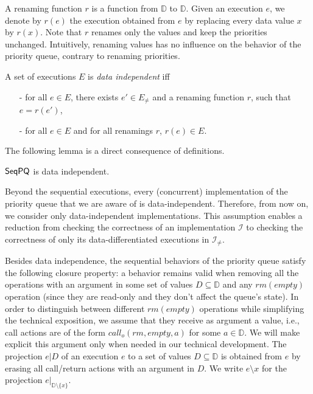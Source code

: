A renaming function $r$ is a function from $\mathbb{D}$ to $\mathbb{D}$. Given an execution $e$, we denote by $r(e)$ the execution obtained from $e$ by replacing every data value $x$ by $r(x)$. Note that $r$ renames only the values and keep the priorities unchanged. Intuitively, renaming values has no influence on the behavior of the priority queue, contrary to renaming priorities.

\begin{definition}\label{def:priority-value data-independence}
A set of executions $E$ is \emph{data independent} iff
\begin{itemize}
\setlength{\itemsep}{0.5pt}
\item[-] for all $e \in E$, there exists $e' \in E_{\neq}$ and a renaming function $r$, such that $e=r(e')$,

\item[-] for all $e \in E$ and for all renamings $r$, $r(e) \in E$.
\end{itemize}
\end{definition}

The following lemma is a direct consequence of definitions.

\begin{lemma}
$\mathsf{SeqPQ}$ is data independent.
\end{lemma}

Beyond the sequential executions, every (concurrent) implementation of the priority queue that we are aware of is data-independent. Therefore, from now on, we consider only data-independent implementations. This assumption enables a reduction from checking the correctness of an implementation $\mathcal{I}$ to checking the correctness of only its data-differentiated executions in $\mathcal{I}_{\neq}$.

Besides data independence, the sequential behaviors of the priority queue satisfy the following closure property: a behavior remains valid when removing all the operations with an argument in some set of values $D \subseteq \mathbb{D}$ and any $\textit{rm}(\textit{empty})$ operation (since they are read-only and they don't affect the queue's state).
In order to distinguish between different $\textit{rm}(\textit{empty})$ operations while simplifying the technical exposition, we assume that they receive as argument a value, i.e., call actions are of the form $\textit{call}_o(\textit{rm},\textit{empty},a)$ for some $a\in \mathbb{D}$. We will make explicit this argument only when needed in our technical development. The projection $e \vert D$ of an execution $e$ to a set of values $D \subseteq \mathbb{D}$ is obtained from $e$ by erasing all call/return actions with an argument in $D$. We write $e \setminus x$ for the projection $e \vert_{ \mathbb{D} \setminus \{ x \} }$.

